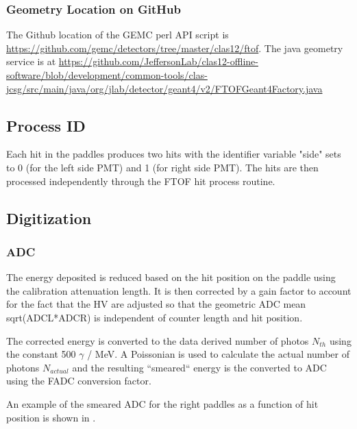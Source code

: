 \subsubsection{Geometry Location on GitHub}
The Github location of the GEMC perl API script is \url{https://github.com/gemc/detectors/tree/master/clas12/ftof}.
The java geometry service is at \url{https://github.com/JeffersonLab/clas12-offline-software/blob/development/common-tools/clas-jcsg/src/main/java/org/jlab/detector/geant4/v2/FTOFGeant4Factory.java}

\subsection{Process ID}

Each hit in the paddles produces two hits with the identifier variable "side" sets to 0 (for the left side PMT) and 1 (for right side PMT).
The hits are then processed independently through the FTOF hit process routine.

\subsection{Digitization}

\subsubsection{ADC}
The energy deposited is reduced based on the hit position on the paddle using the calibration attenuation length. It is then corrected by a gain factor
to account for the fact that the HV are adjusted so that the geometric ADC mean sqrt(ADCL*ADCR) is independent of counter length and hit position.

The corrected energy is converted to the data derived number of photos $N_{th}$ using the constant 500 $\gamma$ / MeV. A Poissonian is used to
calculate the actual number of photons $N_{actual}$ and the resulting ``smeared`` energy is the converted to ADC using the FADC conversion factor.

An example of the smeared ADC for the right paddles as a function of hit position is shown in .

